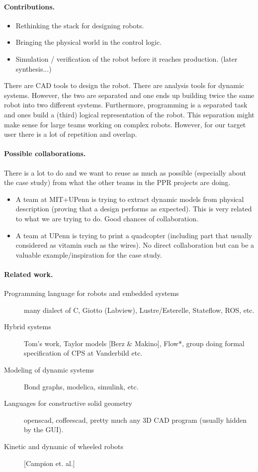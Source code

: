 \paragraph{Contributions.}
\begin{itemize}
\item Rethinking the stack for designing robots.
\item Bringing the physical world in the control logic.
\item Simulation / verification of the robot before it reaches production. (later synthesis...)
\end{itemize}

There are CAD tools to design the robot.
There are analysis tools for dynamic systems.
However, the two are separated and one ends up building twice the same robot into two different systems.
Furthermore, programming is a separated task and ones build a (third) logical representation of the robot.
This separation might make sense for large teams working on complex robots.
However, for our target user there is a lot of repetition and overlap.

\paragraph{Possible collaborations.}
There is a lot to do and we want to reuse as much as possible (especially about the case study) from what the other teams in the PPR projects are doing.
\begin{itemize}
\item A team at MIT+UPenn is trying to extract dynamic models from physical description (proving that a design performs as expected). This is very related to what we are trying to do. Good chances of collaboration.
\item A team at UPenn is trying to print a quadcopter (including part that usually considered as vitamin such as the wires). No direct collaboration but can be a valuable example/inspiration for the case study.
\end{itemize}

\paragraph{Related work.}
\begin{description}
\item[Programming language for robots and embedded systems] many dialect of C, Giotto (Labview), Lustre/Esterelle, Stateflow, ROS, etc.
\item[Hybrid systems] Tom's work, Taylor models [Berz \& Makino], Flow*, group doing formal specification of CPS at Vanderbild etc.
\item[Modeling of dynamic systems] Bond graphs, modelica, simulink, etc.
\item[Languages for constructive solid geometry] openscad, coffeescad, pretty much any 3D CAD program (usually hidden by the GUI).
\item[Kinetic and dynamic of wheeled robots] [Campion et. al.]
\end{description}
